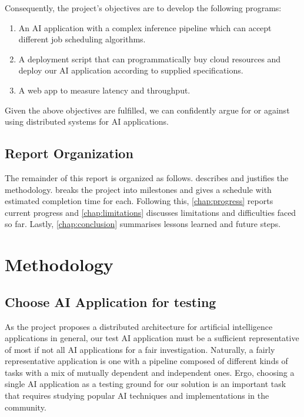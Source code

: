 \documentclass{report}
\begin{document}
Consequently, the project's objectives are to develop the following programs:
\begin{enumerate}
  \item An AI application with a complex inference pipeline which can accept different job scheduling algorithms.
  \item A deployment script that can programmatically buy cloud resources and deploy our AI application according to supplied specifications.
  \item A web app to measure latency and throughput.
\end{enumerate}

Given the above objectives are fulfilled, we can confidently argue for or against using distributed systems for AI applications.

\section{Report Organization}
The remainder of this report is organized as follows.  describes and justifies the methodology.  breaks the project into milestones and gives a schedule with estimated completion time for each. Following this, \cref{chap:progress} reports current progress and \cref{chap:limitations} discusses limitations and difficulties faced so far. Lastly, \cref{chap:conclusion} summarises lessons learned and future steps.

\chapter{Methodology}\label{chap:methodology}

\section{Choose AI Application for testing}
As the project proposes a distributed architecture for artificial intelligence applications in general, our test AI application must be a sufficient representative of most if not all AI applications for a fair investigation. Naturally, a fairly representative application is one with a pipeline composed of different kinds of tasks with a mix of mutually dependent and independent ones. Ergo, choosing a single AI application as a testing ground for our solution is an important task that requires studying popular AI techniques and implementations in the community.
\end{document}
